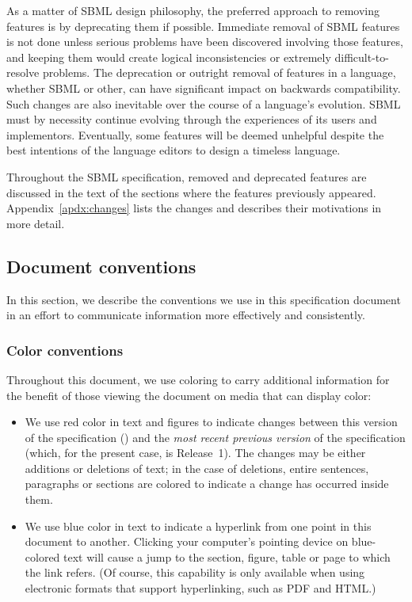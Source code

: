 As a matter of SBML design philosophy, the preferred approach to
removing features is by deprecating them if possible.  Immediate
removal of SBML features is not done unless serious problems have
been discovered involving those features, and keeping them would
create logical inconsistencies or extremely difficult-to-resolve
problems.  The deprecation or outright removal of features in a
language, whether SBML or other, can have significant impact on
backwards compatibility.  Such changes are also inevitable over
the course of a language's evolution.  SBML must by necessity
continue evolving through the experiences of its users and
implementors.  Eventually, some features will be deemed unhelpful
despite the best intentions of the language editors to design a
timeless language.

Throughout the SBML specification, removed and deprecated features
are discussed in the text of the sections where the features
previously appeared.  Appendix~\ref{apdx:changes}
lists the changes and describes their motivations in more detail.


\subsection{Document conventions}
\label{sec:notation}

In this section, we describe the conventions we use in this
specification document in an effort to communicate information
more effectively and consistently.


\subsubsection{Color conventions}
\label{sec:notation-color}

Throughout this document, we use coloring to carry additional
information for the benefit of those viewing the document on media
that can display color:

\begin{itemize}

\item We use red color in text and figures to indicate changes
  between this version of the specification (\thisLVR) and the
  \emph{most recent previous version} of the specification (which,
  for the present case, is \sbmltwotwo Release~1).  The changes
  may be either additions or deletions of text; in the case of
  deletions, entire sentences, paragraphs or sections are colored
  to indicate a change has occurred inside them.

\item We use blue color in text to indicate a hyperlink from one
  point in this document to another.  Clicking your computer's
  pointing device on blue-colored text will cause a jump to the
  section, figure, table or page to which the link refers.  (Of
  course, this capability is only available when using electronic
  formats that support hyperlinking, such as PDF and
  HTML.)

\end{itemize}


